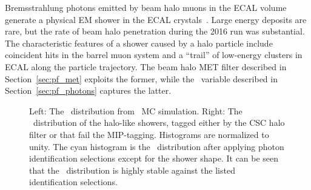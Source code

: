 Bremsstrahlung photons emitted by beam halo muons in the ECAL volume generate a physical EM shower in the ECAL crystals~\cite{Halo2015}. 
Large energy deposits are rare, but the rate of beam halo penetration during the 2016 run was substantial.
The characteristic features of a shower caused by a halo particle include coincident hits in the barrel muon system and a ``trail'' of low-energy clusters in ECAL along the particle trajectory. 
The beam halo MET filter described in Section~\ref{sec:pf_met} exploits the former, while the \emip\ variable described in Section~\ref{sec:pf_photons} captures the latter.

\begin{figure}[htbp]
  \centering
  \caption{
    Left: The \phig\ distribution from \zinvg\ MC simulation. \qquad \qquad
    Right: The \phig\ distribution of the halo-like showers, tagged either by the CSC halo filter or that fail the MIP-tagging.
    Histograms are normalized to unity.
    The cyan histogram is the \phig\ distribution after applying photon identification selections except for the shower shape. 
    It can be seen that the \phig\ distribution is highly stable against the listed identification selections.
  }
  \label{fig:halophi}
\end{figure}

